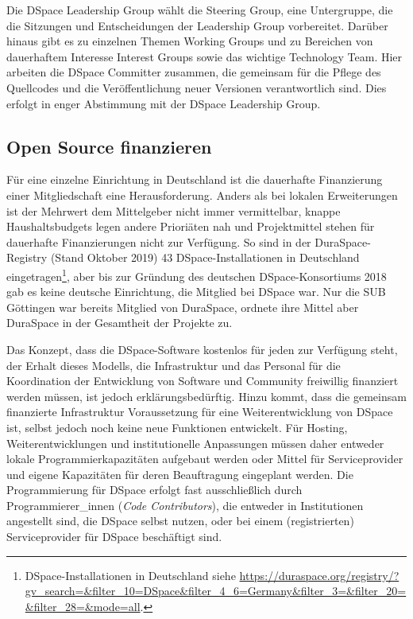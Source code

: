 \documentclass[a4paper,
fontsize=11pt,
oneside,
numbers=noperiodatend,
parskip=half-,
bibliography=totoc,
final
]{scrartcl}
\begin{document}
Die DSpace Leadership Group wählt die Steering Group, eine Untergruppe,
die die Sitzungen und Entscheidungen der Leadership Group vorbereitet.
Darüber hinaus gibt es zu einzelnen Themen Working Groups und zu
Bereichen von dauerhaftem Interesse Interest Groups sowie das wichtige
Technology Team. Hier arbeiten die DSpace Committer zusammen, die
gemeinsam für die Pflege des Quellcodes und die Veröffentlichung neuer
Versionen verantwortlich sind. Dies erfolgt in enger Abstimmung mit der
DSpace Leadership Group.

\hypertarget{open-source-finanzieren}{%
\subsection{Open Source finanzieren}\label{open-source-finanzieren}}

Für eine einzelne Einrichtung in Deutschland ist die dauerhafte
Finanzierung einer Mitgliedschaft eine Herausforderung. Anders als bei
lokalen Erweiterungen ist der Mehrwert dem Mittelgeber nicht immer
vermittelbar, knappe Haushaltsbudgets legen andere Prioriäten nah und
Projektmittel stehen für dauerhafte Finanzierungen nicht zur Verfügung.
So sind in der Dura\-Space-Registry (Stand Oktober 2019) 43
DSpace-Installationen in Deutschland eingetragen\footnote{DSpace-Installationen
  in Deutschland siehe
  \url{https://duraspace.org/registry/?gv_search=&filter_10=DSpace&filter_4_6=Germany&filter_3=&filter_20=&filter_28=&mode=all}.},
aber bis zur Gründung des deutschen DSpace-Konsortiums 2018 gab es keine
deutsche Einrichtung, die Mitglied bei DSpace war. Nur die SUB Göttingen
war bereits Mitglied von DuraSpace, ordnete ihre Mittel aber DuraSpace
in der Gesamtheit der Projekte zu.

Das Konzept, dass die DSpace-Software kostenlos für jeden zur Verfügung
steht, der Erhalt dieses Modells, die Infrastruktur und das Personal für
die Koordination der Entwicklung von Software und Community freiwillig
finanziert werden müssen, ist jedoch erklärungsbedürftig. Hinzu kommt,
dass die gemeinsam finanzierte Infrastruktur Voraussetzung für eine
Weiterentwicklung von DSpace ist, selbst jedoch noch keine neue
Funktionen entwickelt. Für Hosting, Weiterentwicklungen und
institutionelle Anpassungen müssen daher entweder lokale
Programmierkapazitäten aufgebaut werden oder Mittel für Serviceprovider
und eigene Kapazitäten für deren Beauftragung eingeplant werden. Die
Programmierung für DSpace erfolgt fast ausschließlich durch
Programmierer\_innen (\emph{Code Contributors}), die entweder in
Institutionen angestellt sind, die DSpace selbst nutzen, oder bei einem
(registrierten) Serviceprovider für DSpace beschäftigt sind.
\end{document}
